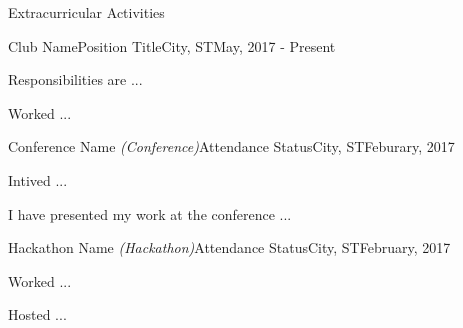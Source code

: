 \begin{resume_section}{Extracurricular Activities}
  \begin{resume_employer}{Club Name}{Position Title}{City, ST}{May, 2017 - Present}
    \item Responsibilities are ...
    \item Worked ...
  \end{resume_employer}
  \begin{resume_employer}{Conference Name \textit{(Conference)}}{Attendance Status}{City, ST}{Feburary, 2017}
    \item Intived ...
    \item I have presented my work at the conference ...
  \end{resume_employer}
  \begin{resume_employer}{Hackathon Name \textit{(Hackathon)}}{Attendance Status}{City, ST}{February, 2017}
    \item Worked ...
    \item Hosted ...
  \end{resume_employer}
\end{resume_section}
